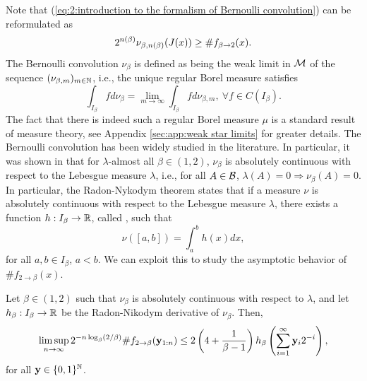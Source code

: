 Note that (\ref{eq:2:introduction to the formalism of Bernoulli convolution}) can be reformulated as
\begin{equation}\label{eq:4:introduction to the formalism of Bernoulli convolution}
    2^{n(\beta)} \nu_{\beta,n(\beta)}(J(x)) \geq \#f_{\beta \to 2}(x).
\end{equation}
The Bernoulli convolution $\nu_\beta$ is defined as being the weak limit in $\mathcal{M}$ of the sequence $(\nu_{\beta,m})_{m \in \mathbb{N}}$, i.e., the unique regular Borel measure satisfies
\begin{equation}\label{eq:5:introduction to the formalism of Bernoulli convolution}
    \int_{I_\beta} f d\nu_\beta = \lim_{m \to \infty}\int_{I_\beta} f d\nu_{\beta,m},\ \forall f \in C(I_\beta).
\end{equation}
The fact that there is indeed such a regular Borel measure $\mu$ is a standard result of measure theory, see Appendix \ref{sec:app:weak star limits} for greater details. The Bernoulli convolution has been widely studied in the literature. In particular, it was shown in \cite{solomyak1995random} that for $\lambda$-almost all $\beta \in (1,2)$, $\nu_\beta$ is absolutely continuous with respect to the Lebesgue measure $\lambda$, i.e., for all $A \in \mathcal{B}$, $\lambda(A) = 0 \Rightarrow \nu_\beta(A) = 0$. In particular, the Radon-Nykodym theorem \cite[Section 31, Theorem B]{halmos1950MeasureTheory} states that if a measure $\nu$ is absolutely continuous with respect to the Lebesgue measure $\lambda$, there exists a function $h : I_\beta \to \mathbb{R}$, called , such that 
\begin{equation}
    \nu\left([a,b]\right) = \int_{a}^{b} h(x) dx,
\end{equation}
for all $a, b \in I_\beta$, $a < b$. We can exploit this to study the asymptotic behavior of $\#f_{2 \to \beta}(x)$.
\begin{theorem}\label{thm:asymptotic behavior of card f x when the Bernoulli convolution is absolutely continuous}
    Let $\beta \in (1,2)$ such that $\nu_\beta$ is absolutely continuous with respect to $\lambda$, and let $h_\beta : I_\beta \to \mathbb{R}$ be the Radon-Nikodym derivative of $\nu_\beta$. Then,
    \begin{equation}
        \limsup_{n\to\infty} 2^{-n\log_\beta(2/\beta)} \#f_{2 \to \beta}({\bf y}_{1:n}) \leq 2\left(4 + \frac{1}{\beta-1}\right) h_\beta\left(\sum_{i=1}^\infty {\bf y}_i 2^{-i}\right),
    \end{equation}
    for all ${\bf y} \in \{0,1\}^{\mathbb{N}}$.
\end{theorem}
